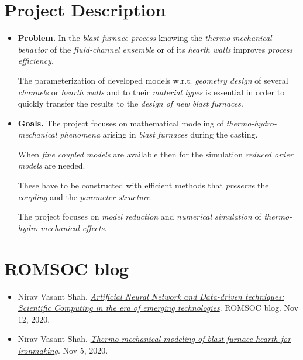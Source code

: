 \documentclass{book}
\numberwithin{equation}{section}
\begin{document}
\section{Project Description}
\begin{itemize}
    \item \textbf{Problem.} In the \textit{blast furnace process} knowing the \textit{thermo-mechanical behavior} of the \textit{fluid-channel ensemble} or of its \textit{hearth walls} improves \textit{process efficiency}.
    
    The parameterization of developed models w.r.t. \textit{geometry design} of several \textit{channels} or \textit{hearth walls} and to their \textit{material types} is essential in order to quickly transfer the results to the \textit{design of new blast furnaces}.
    \item \textbf{Goals.} The project focuses on mathematical modeling of \textit{thermo-hydro-mechanical phenomena} arising in \textit{blast furnaces} during the casting.
    
    When \textit{fine coupled models} are available then for the simulation \textit{reduced order models} are needed.
    
    These have to be constructed with efficient methods that \textit{preserve} the \textit{coupling} and the \textit{parameter structure}.
    
    The project focuses on \textit{model reduction} and \textit{numerical simulation} of \textit{thermo-hydro-mechanical effects}.
\end{itemize}

\section{ROMSOC blog}
\begin{itemize}
    \item Nirav Vasant Shah. \href{https://www.romsoc.eu/artificial-neural-network-and-data-driven-techniques-scientific-computing-in-the-era-of-emerging-technologies/}{\textit{Artificial Neural Network and Data-driven techniques: Scientific Computing in the era of emerging technologies}}. ROMSOC blog. Nov 12, 2020.
    \item Nirav Vasant Shah. \href{https://www.romsoc.eu/thermo-mechanical-modeling-of-blast-furnace-hearth-for-ironmaking/}{\textit{Thermo-mechanical modeling of blast furnace hearth for ironmaking}}. Nov 5, 2020.
\end{itemize}
\end{document}

